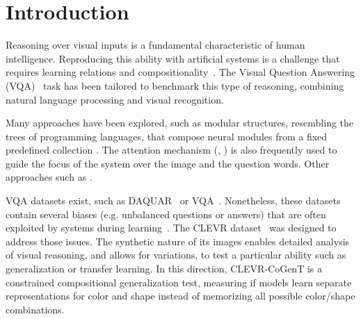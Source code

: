 \section{Introduction}
Reasoning over visual inputs is a fundamental characteristic of human intelligence.
Reproducing this ability with artificial systems is a challenge that requires learning relations and compositionality~\citep{hu2017learning, johnson2017inferring}. The Visual Question Answering (VQA)~\citep{antol2015vqa,malinowski2014towards,wu2017visual} task has been tailored to benchmark this type of reasoning, combining natural language processing and visual recognition.


Many approaches have been explored, 
such as modular structures, resembling the trees of programming languages, that compose neural modules from a fixed predefined collection \cite{andreas2016learning,johnson2017inferring, mascharka2018transparency}. The attention mechanism (\cite{bahdanau2014neural}, \cite{xu2015show}) is also frequently used to guide the focus of the system over the image and the question words.
Other approaches such as .


VQA datasets exist, such as DAQUAR~\citep{malinowski2014multi} or VQA~\citep{antol2015vqa}. Nonetheless, these datasets contain several biases (e.g. unbalanced questions or answers) that are often exploited by systems during learning~\citep{goyal2017making}.
The CLEVR dataset~\citep{johnson2017clevr} was designed to address those issues. The synthetic nature of its images enables detailed analysis of visual reasoning, and allows for variations, to test a particular ability such as generalization or transfer learning. In this direction, CLEVR-CoGenT is a constrained compositional generalization test, measuring if models learn separate representations for color and shape instead of memorizing all possible color/shape combinations.


